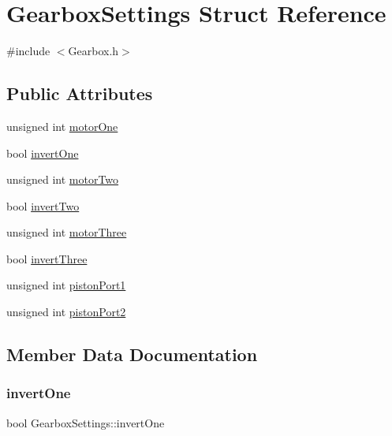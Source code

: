\hypertarget{structGearboxSettings}{}\section{Gearbox\+Settings Struct Reference}
\label{structGearboxSettings}


{\ttfamily \#include $<$Gearbox.\+h$>$}

\subsection*{Public Attributes}
\begin{DoxyCompactItemize}
\item 
unsigned int \hyperlink{structGearboxSettings_a962be3316447204b1b50ee2627eebc30}{motor\+One}
\item 
bool \hyperlink{structGearboxSettings_a4c410cb653a94189687d7dbec6d207fe}{invert\+One}
\item 
unsigned int \hyperlink{structGearboxSettings_a05a24bf8a86b1637dc0070c35abf7eaa}{motor\+Two}
\item 
bool \hyperlink{structGearboxSettings_a6bc159937c7448100101ce40ba4d60fc}{invert\+Two}
\item 
unsigned int \hyperlink{structGearboxSettings_aff6da1d07c8785012e05b656c9fd98ce}{motor\+Three}
\item 
bool \hyperlink{structGearboxSettings_aa27fbac69d808734e5a57a85f47426da}{invert\+Three}
\item 
unsigned int \hyperlink{structGearboxSettings_aef05348dd1e0aa46face95b11f66faa3}{piston\+Port1}
\item 
unsigned int \hyperlink{structGearboxSettings_ab3d3ea38cd44aea229c7aaccf537ab0b}{piston\+Port2}
\end{DoxyCompactItemize}


\subsection{Member Data Documentation}
\mbox{\label{structGearboxSettings_a4c410cb653a94189687d7dbec6d207fe}} 
\subsubsection{\texorpdfstring{invert\+One}{invertOne}}
{\footnotesize\ttfamily bool Gearbox\+Settings\+::invert\+One}

